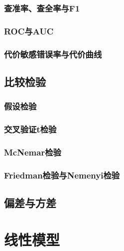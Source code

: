 \documentclass{article}
\begin{document}
\subsubsection{查准率、查全率与F1}

\subsubsection{ROC与AUC}

\subsubsection{代价敏感错误率与代价曲线}

\subsection{比较检验}

\subsubsection{假设检验}

\subsubsection{交叉验证t检验}

\subsubsection{McNemar检验}

\subsubsection{Friedman检验与Nemenyi检验}

\subsection{偏差与方差}

\section{线性模型}
\end{document}
